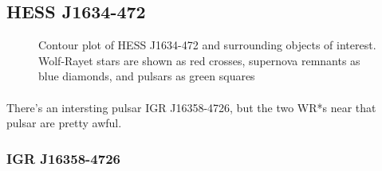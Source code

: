 \documentclass[a4paper, titlepage, oneside]{article}
\begin{document}
\begin{multicols}{2}
\subsection{HESS J1634-472}
\label{sec:hess34}

\begin{figure}[H]
  \centering
  \caption{Contour plot of HESS J1634-472 and surrounding objects of interest. Wolf-Rayet stars are shown as red crosses, supernova remnants as blue diamonds, and pulsars as green squares}
  \label{fig:hess34}
\end{figure}

\paragraph{}
There's an intersting pulsar IGR J16358-4726, but the two WR*s near that pulsar are pretty awful.

\subsubsection{IGR J16358-4726}

\end{multicols}
\end{document}
